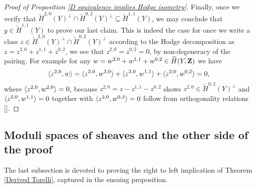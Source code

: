 \begin{proof}[Proof of Proposition \ref{D equivalence implies Hodge isometry}]
    Finally, once we verify that $\widetilde{H}^{2,0}(Y)^\perp \cap \widetilde{H}^{0,2}(Y)^\perp \subseteq \widetilde{H}^{1,1}(Y)$, we may conclude that $y \in \widetilde{H}^{1,1}(Y)$ to prove our last claim.
    This is indeed the case for once we write a class $z \in \widetilde{H}^{2,0}(Y)^\perp \cap \widetilde{H}^{0,2}(Y)^\perp$ according to the Hodge decomposition as $z = z^{2,0} + z^{1,1} + z^{0,2}$, we see that $z^{2,0} = z^{0,2} = 0$, by non-degeneracy of the pairing. For example for any $w = w^{2,0} + w^{1,1} + w^{0,2} \in \widetilde{H}(Y, \mathbf Z)$ we have
    \[
        \langle z^{2,0}, w \rangle = \langle z^{2,0}, w^{2,0} \rangle + \langle z^{2,0}, w^{1,1} \rangle + \langle z^{2,0}, w^{0,2} \rangle = 0,
    \]
    where $\langle z^{2,0}, w^{2,0} \rangle = 0$, because $z^{2,0} = z - z^{1,1} - z^{0,2}$ shows $z^{2,0} \in \widetilde{H}^{0,2}(Y)^\perp$ and $\langle z^{2,0}, w^{1,1} \rangle = 0$ together with $\langle z^{2,0}, w^{0,2} \rangle = 0$ follow from orthogonality relations \eqref{}. \qedhere
    
    
    
    
\end{proof}

\subsection{Moduli spaces of sheaves and the other side of the proof}

The last subsection is devoted to proving the right to left implication of Theorem \ref{Derived Torelli}, captured in the ensuing proposition.

